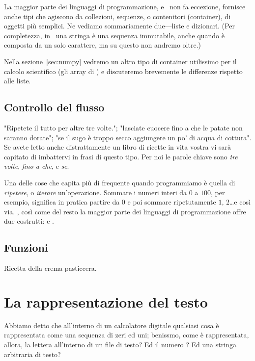
La maggior parte dei linguaggi di programmazione, e \python\ non fa eccezione, fornisce
anche tipi che agiscono da collezioni, sequenze, o contenitori (container), di oggetti pi\`u
semplici. Ne vediamo sommariamente due---liste e dizionari. (Per completezza, in
\python\ una stringa \`e una sequenza immutabile, anche quando \`e composta da un solo
carattere, ma su questo non andremo oltre.)

Nella sezione~\ref{sec:numpy} vedremo un altro tipo di container utilissimo per il
calcolo scientifico (gli array di \numpy) e discuteremo brevemente le differenze
rispetto alle liste.


\subsection{Controllo del flusso}

"Ripetete il tutto per altre tre volte."; "lasciate cuocere fino a che le patate
non saranno dorate"; "se il sugo \`e troppo secco aggiungere un po' di acqua di
cottura". Se avete letto anche distrattamente un libro di ricette in vita vostra
vi sar\`a capitato di imbattervi in frasi di questo tipo. Per noi le parole chiave
sono \emph{tre volte}, \emph{fino a che}, e \emph{se}.

Una delle cose che capita pi\`u di frequente quando programmiamo \`e quella di
\emph{ripetere}, o \emph{iterare} un'operazione. Sommare i numeri interi da $0$ a
$100$, per esempio, significa in pratica partire da $0$ e poi sommare ripetutamente
$1$, $2$\ldots e cos\`i via. \python, cos\`i come del resto la maggior parte dei
linguaggi di programmazione offre due costrutti:  e .



\subsection{Funzioni}

Ricetta della crema pasticcera.



\section{La rappresentazione del testo}
\label{sec:rappresentazione_testo}

Abbiamo detto che all'interno di un calcolatore digitale qualsiasi cosa \`e rappresentata
come una sequenza di zeri ed uni; benissmo, come \`e rappresentata, allora, la lettera
 all'interno di un file di testo? Ed il numero ? Ed una stringa
arbitraria di testo?


